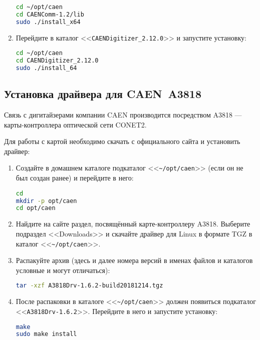 \documentclass[12pt, a4paper, oneside, onecolumn]{book}
\newcommand{\DIRECTORY}[1]{<<{\tt #1}>>}
\begin{document}
\begin{enumerate}
\begin{lstlisting}[language=bash]
cd ~/opt/caen
cd CAENComm-1.2/lib
sudo ./install_x64
\end{lstlisting}

\item Перейдите в каталог \DIRECTORY{CAENDigitizer\_2.12.0} и запустите установку:

\begin{lstlisting}[language=bash]
cd ~/opt/caen
cd CAENDigitizer_2.12.0
sudo ./install_64
\end{lstlisting}

\end{enumerate}

\subsection{Установка драйвера для CAEN~A3818}

Связь с дигитайзерами компании CAEN производится посредством A3818 --- карты-контроллера оптической сети CONET2.

Для работы с картой необходимо скачать с официального сайта \cite{CaenHome} и установить драйвер:

\begin{enumerate}

\item Создайте в домашнем каталоге подкаталог \DIRECTORY{\~{}/opt/caen} (если он не был создан ранее) и перейдите в него:

\begin{lstlisting}[language=bash]
cd
mkdir -p opt/caen
cd opt/caen
\end{lstlisting}

\item Найдите на сайте \cite{CaenHome} раздел, посвящённый карте-контроллеру A3818. Выберите подраздел <<Downloads>> и скачайте драйвер для Linux  в формате TGZ в каталог \DIRECTORY{\~{}/opt/caen}.

\item Распакуйте архив (здесь и далее номера версий в именах файлов и каталогов условные и могут отличаться):

\begin{lstlisting}[language=bash]
tar -xzf A3818Drv-1.6.2-build20181214.tgz
\end{lstlisting}

\item После распаковки в каталоге \DIRECTORY{\~{}/opt/caen} должен появиться подкаталог \DIRECTORY{A3818Drv-1.6.2}. Перейдите в него и запустите установку:

\begin{lstlisting}[language=bash]
make
sudo make install
\end{lstlisting}

\end{enumerate}
\end{document}
